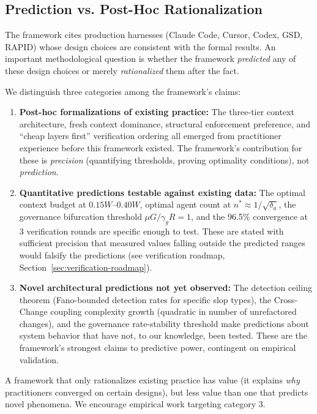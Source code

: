 \documentclass[11pt, a4paper]{googledeepmind}
\begin{document}
\subsection{Prediction vs. Post-Hoc Rationalization}

The framework cites production harnesses (Claude Code, Cursor, Codex, GSD, RAPID) whose design choices are consistent with the formal results. An important methodological question is whether the framework \emph{predicted} any of these design choices or merely \emph{rationalized} them after the fact.

We distinguish three categories among the framework's claims:

\begin{enumerate}[nosep]
    \item \textbf{Post-hoc formalizations of existing practice:} The three-tier context architecture, fresh context dominance, structural enforcement preference, and ``cheap layers first'' verification ordering all emerged from practitioner experience before this framework existed. The framework's contribution for these is \emph{precision} (quantifying thresholds, proving optimality conditions), not \emph{prediction}.

    \item \textbf{Quantitative predictions testable against existing data:} The optimal context budget at $0.15W$--$0.40W$, optimal agent count at $n^* \approx 1/\sqrt{\delta_a}$, the governance bifurcation threshold $\mu G / \gamma_g R = 1$, and the 96.5\% convergence at 3 verification rounds are specific enough to test. These are stated with sufficient precision that measured values falling outside the predicted ranges would falsify the predictions (see verification roadmap, Section~\ref{sec:verification-roadmap}).

    \item \textbf{Novel architectural predictions not yet observed:} The detection ceiling theorem (Fano-bounded detection rates for specific slop types), the Cross-Change coupling complexity growth (quadratic in number of unrefactored changes), and the governance rate-stability threshold make predictions about system behavior that have not, to our knowledge, been tested. These are the framework's strongest claims to predictive power, contingent on empirical validation.
\end{enumerate}

A framework that only rationalizes existing practice has value (it explains \emph{why} practitioners converged on certain designs), but less value than one that predicts novel phenomena. We encourage empirical work targeting category 3.
\end{document}
